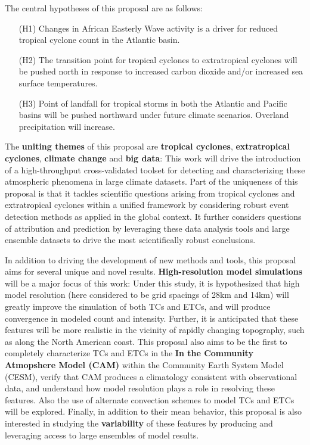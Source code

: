 \documentclass[11pt]{article}
\begin{document}
The central hypotheses of this proposal are as follows:

\vspace{-0.4cm}
\begin{itemize}
\item[(H1)] Changes in African Easterly Wave activity is a driver for reduced tropical cyclone count in the Atlantic basin.

\item[(H2)] The transition point for tropical cyclones to extratropical cyclones will be pushed north in response to increased carbon dioxide and/or increased sea surface temperatures.

\item[(H3)] Point of landfall for tropical storms in both the Atlantic and Pacific basins will be pushed northward under future climate scenarios.  Overland precipitation will increase.
\end{itemize}

The \textbf{uniting themes} of this proposal are \textbf{tropical cyclones}, \textbf{extratropical cyclones}, \textbf{climate change} and \textbf{big data}: This work will drive the introduction of a high-throughput cross-validated toolset for detecting and characterizing these atmospheric phenomena in large climate datasets.  Part of the uniqueness of this proposal is that it tackles scientific questions arising from tropical cyclones and extratropical cyclones within a unified framework by considering robust event detection methods as applied in the global context.  It further considers questions of attribution and prediction by leveraging these data analysis tools and large ensemble datasets to drive the most scientifically robust conclusions.

In addition to driving the development of new methods and tools, this proposal aims for several unique and novel results.  \textbf{High-resolution model simulations} will be a major focus of this work:  Under this study, it is hypothesized that high model resolution (here considered to be grid spacings of 28km and 14km) will greatly improve the simulation of both TCs and ETCs, and will produce convergence in modeled count and intensity.  Further, it is anticipated that these features will be more realistic in the vicinity of rapidly changing topography, such as along the North American coast.  This proposal also aims to be the first to completely characterize TCs and ETCs in the \textbf{In the Community Atmopshere Model (CAM)} within the Community Earth System Model (CESM), verify that CAM produces a climatology consistent with observational data, and understand how model resolution plays a role in resolving these features.  Also the use of alternate convection schemes to model TCs and ETCs will be explored.  Finally, in addition to their mean behavior, this proposal is also interested in studying the \textbf{variability} of these features by producing and leveraging access to large ensembles of model results.
\end{document}
